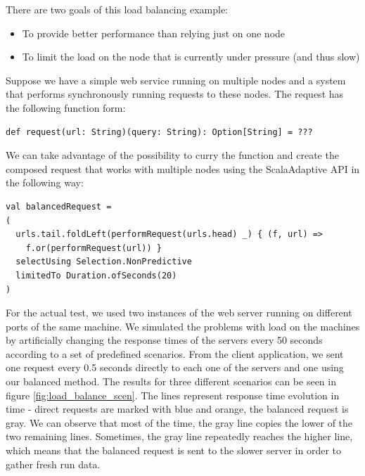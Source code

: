 There are two goals of this load balancing example:

\begin{itemize}
	\item To provide better performance than relying just on one node
	\item To limit the load on the node that is currently under pressure (and thus slow)
\end{itemize}

Suppose we have a simple web service running on multiple nodes and a system that performs synchronously running requests to these nodes. The request has the following function form:

\lstset{style=Scala}
\begin{lstlisting}
def request(url: String)(query: String): Option[String] = ???
\end{lstlisting}

We can take advantage of the possibility to curry the function and create the composed request that works with multiple nodes using the ScalaAdaptive API in the following way:

\lstset{style=Scala}
\begin{lstlisting}
val balancedRequest =
(
  urls.tail.foldLeft(performRequest(urls.head) _) { (f, url) =>
    f.or(performRequest(url)) } 
  selectUsing Selection.NonPredictive 
  limitedTo Duration.ofSeconds(20)
)
\end{lstlisting}

For the actual test, we used two instances of the web server running on different ports of the same machine. We simulated the problems with load on the machines by artificially changing the response times of the servers every 50 seconds according to a set of predefined scenarios. From the client application, we sent one request every 0.5 seconds directly to each one of the servers and one using our balanced method. The results for three different scenarios can be seen in figure \ref{fig:load_balance_scen}. The lines represent response time evolution in time - direct requests are marked with blue and orange, the balanced request is gray. We can observe that most of the time, the gray line copies the lower of the two remaining lines. Sometimes, the gray line repeatedly reaches the higher line, which means that the balanced request is sent to the slower server in order to gather fresh run data.

